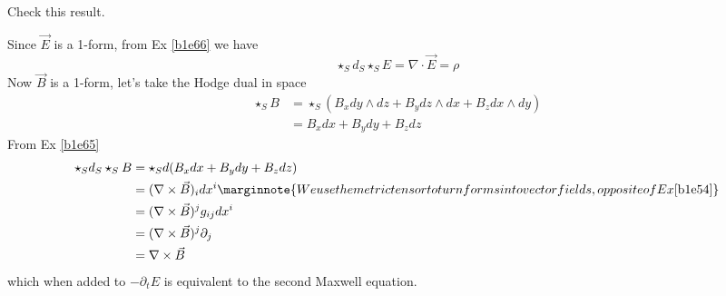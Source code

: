 \documentclass[10pt]{article}
\begin{document}
\begin{example}
	Check this result.
\end{example}
\sol Since $\vec{E}$ is a 1-form, from Ex \ref{b1e66} we have
$$
\star_Sd_S\star_SE = \nabla \cdot \vec{E} = \rho
$$
Now $\vec{B}$ is a 1-form, let's take the Hodge dual in space
$$
\begin{aligned}
	\star_SB &= \star_S(B_x dy \wedge dz + B_y dz \wedge dx + B_z dx \wedge dy)\\
	&= B_x dx + B_y dy + B_z dz
\end{aligned}
$$
From Ex \ref{b1e65}
$$
\begin{aligned}
	\star_Sd_S\star_SB &= \star_Sd(B_x dx + B_y dy + B_z dz)\\
	&= (\nabla \times \vec{B})_i dx^i\marginnote{We use the metric tensor to turn forms into vector fields, opposite of Ex \ref{b1e54}}\\
	&= (\nabla \times \vec{B})^j g_{ij} dx^i\\
	&= (\nabla \times \vec{B})^j \partial_j\\
	&= \nabla \times \vec{B}
\end{aligned}
$$
which when added to $-\partial_tE$ is equivalent to the second Maxwell equation.
\end{document}
